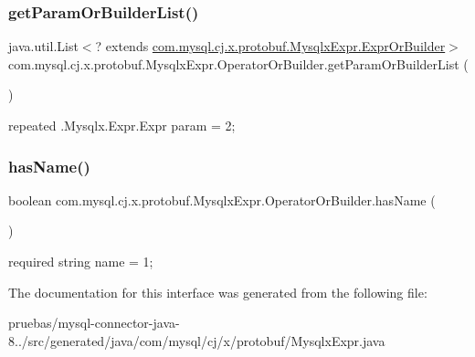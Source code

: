 \subsubsection{\texorpdfstring{get\+Param\+Or\+Builder\+List()}{getParamOrBuilderList()}}
{\footnotesize\ttfamily java.\+util.\+List$<$? extends \mbox{\hyperlink{interfacecom_1_1mysql_1_1cj_1_1x_1_1protobuf_1_1_mysqlx_expr_1_1_expr_or_builder}{com.\+mysql.\+cj.\+x.\+protobuf.\+Mysqlx\+Expr.\+Expr\+Or\+Builder}}$>$ com.\+mysql.\+cj.\+x.\+protobuf.\+Mysqlx\+Expr.\+Operator\+Or\+Builder.\+get\+Param\+Or\+Builder\+List (\begin{DoxyParamCaption}{ }\end{DoxyParamCaption})}

{\ttfamily repeated .Mysqlx.\+Expr.\+Expr param = 2;} \mbox{\label{interfacecom_1_1mysql_1_1cj_1_1x_1_1protobuf_1_1_mysqlx_expr_1_1_operator_or_builder_a2308890fccea041bbce31293bcfded83}} 
\subsubsection{\texorpdfstring{has\+Name()}{hasName()}}
{\footnotesize\ttfamily boolean com.\+mysql.\+cj.\+x.\+protobuf.\+Mysqlx\+Expr.\+Operator\+Or\+Builder.\+has\+Name (\begin{DoxyParamCaption}{ }\end{DoxyParamCaption})}

{\ttfamily required string name = 1;} 

The documentation for this interface was generated from the following file\+:\begin{DoxyCompactItemize}
\item 
pruebas/mysql-\/connector-\/java-\/8../src/generated/java/com/mysql/cj/x/protobuf/Mysqlx\+Expr.\+java\end{DoxyCompactItemize}
